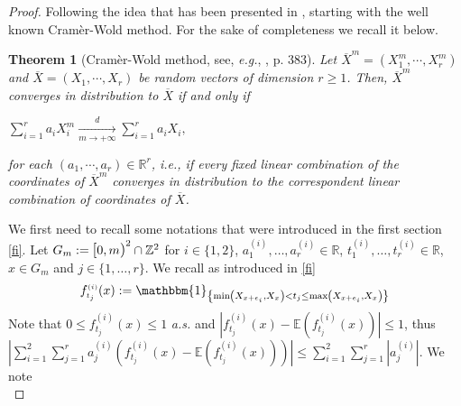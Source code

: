 \documentclass[12pt]{article}
\theoremstyle{Theorem}
\newtheorem{Theorem}{Theorem}[section]
\begin{document}
\begin{proof}
Following the idea that has been presented in \cite{Psymetrie}, 
starting with the well known Cram\`{e}r-Wold method. For the sake of completeness we recall it below.
\begin{Theorem}[Cram\`{e}r-Wold method, see, \textit{e.g.},  \cite{Billingsley}, p. 383]\label{Cramerwold}
Let $\overline {X}^{\scriptscriptstyle m} = (X^{m}_{\scriptscriptstyle 1}, \cdots, X^{m}_{\scriptscriptstyle r})$ and $\overline {X} = (X_{\scriptscriptstyle 1}, \cdots, X_{\scriptscriptstyle r})$ be random vectors of dimension $r \geq 1$. Then, $\overline {X}^{\scriptscriptstyle m}$ converges in distribution to $\overline {X}$ if and only if
\begin{center}
$\sum_{i = 1}^{r} a_{i}X_{i}^{m} \xrightarrow[m \to + \infty]{d} \sum_{i = 1}^{r} a_iX_i,$\end{center}
for each $(a_1, \cdots, a_r) \in \mathbb{R}^{r}$, \textit{i.e.}, if every fixed linear combination of the coordinates of $\overline{X}^{m}$ converges in distribution to the correspondent linear combination of coordinates of $\overline {X}$.
\end{Theorem}
We first need to recall some notations that were introduced in the first section \eqref{fi}. Let $G_{m} := \text{\larger[1]{$[$}}0, m \text{\larger[1]{$)$}}^{2} \cap \mathbb{Z}^{2}$  for $i \in \{1,2\}$,  $a^{\scriptscriptstyle (i)}_{1}, \ldots, a^{\scriptscriptstyle (i)}_{r} \in \mathbb{R}$, $t^{\scriptscriptstyle (i)}_{1}, \ldots, t^{\scriptscriptstyle (i)}_{r} \in \mathbb{R}$, $x \in G_{m}$ and $j \in \{1,\ldots,r\}$.  We recall as introduced in \eqref{fi}
\begin{align*}
f_{\scriptscriptstyle t_j}^{\scriptscriptstyle (i)}(x) := \mathbbm{1}_{\left\{\min\left(X_{x+e_{i}}, X_{\scriptscriptstyle x}\right) < t_j \leq \max\left(X_{x+e_{i}}, X_{\scriptscriptstyle x}\right)\right\}}
\end{align*}
Note that $0 \leq f_{\scriptscriptstyle t_j}^{\scriptscriptstyle (i)}(x) \leq 1$ \textit{a.s.} and $|f_{\scriptscriptstyle t_j}^{\scriptscriptstyle (i)}(x) - \mathbb{E}(f_{\scriptscriptstyle t_j}^{\scriptscriptstyle (i)}(x))| \leq 1$, \linebreak thus $|\sum^{2}_{i = 1}\sum_{j=1}^{r} a^{\scriptscriptstyle (i)}_j(f_{\scriptscriptstyle t_j}^{\scriptscriptstyle (i)}(x) - \mathbb{E}(f_{\scriptscriptstyle t_j}^{\scriptscriptstyle (i)}(x)))| \leq \sum_{i = 1}^{2}\sum_{j =1}^{r} |a^{\scriptscriptstyle (i)}_j|$.
We note
\begin{equation}

\end{equation}
\end{proof}
\end{document}
